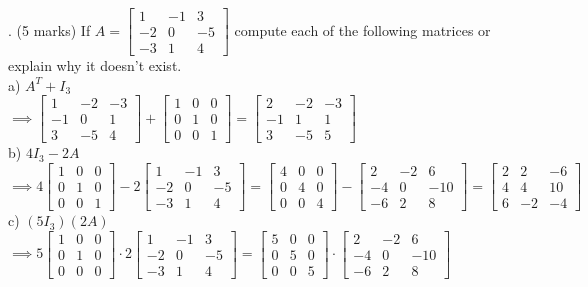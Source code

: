 \documentclass[a4paper]{article}
\begin{document}
. (5 marks) If $A = \begin{bmatrix}
1&-1&3\\
-2&0&-5\\
-3&1&4
\end{bmatrix}$ compute each of the following matrices or explain why it doesn't exist.\\
a) $A^T + I_3$\\
$\implies\begin{bmatrix}
1&-2&-3\\
-1&0&1\\
3&-5&4
\end{bmatrix} + \begin{bmatrix}
1&0&0\\
0&1&0\\
0&0&1
\end{bmatrix} = \begin{bmatrix}
2&-2&-3\\
-1&1&1\\
3&-5&5
\end{bmatrix}$\\
b) $4I_3 - 2A$\\
$\implies 4\begin{bmatrix}
1&0&0\\
0&1&0\\
0&0&1
\end{bmatrix} - 2\begin{bmatrix}
1&-1&3\\
-2&0&-5\\
-3&1&4
\end{bmatrix} = \begin{bmatrix}
4&0&0\\
0&4&0\\
0&0&4
\end{bmatrix} - \begin{bmatrix}
2&-2&6\\
-4&0&-10\\
-6&2&8
\end{bmatrix} = \begin{bmatrix}
2&2&-6\\
4&4&10\\
6&-2&-4
\end{bmatrix}$\\
c) $(5I_3)(2A)$\\
$\implies 5\begin{bmatrix}
1&0&0\\
0&1&0\\
0&0&0
\end{bmatrix} \cdot 2\begin{bmatrix}
1&-1&3\\
-2&0&-5\\
-3&1&4
\end{bmatrix} = \begin{bmatrix}
5&0&0\\
0&5&0\\
0&0&5
\end{bmatrix} \cdot \begin{bmatrix}
2&-2&6\\
-4&0&-10\\
-6&2&8
\end{bmatrix}$\\
\end{document}
